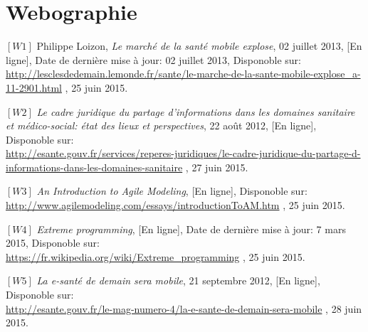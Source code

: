 
\chapter*{Webographie}

\footnotesize

\noindent $[W1]$ \hspace{2pt} Philippe Loizon, \textit{Le marché de la santé mobile explose}, 02 juillet 2013, [En ligne], Date de dernière mise à jour: 02 juillet 2013, Disponoble sur: \\
\scriptsize{\underline{http://lesclesdedemain.lemonde.fr/sante/le-marche-de-la-sante-mobile-explose\_a-11-2901.html}} \footnotesize, 25 juin 2015.

\vspace{8pt}
\paragraphmark

\noindent $[W2]$ \hspace{2pt} \textit{Le cadre juridique du partage d’informations dans les domaines sanitaire et médico-social: état des lieux et perspectives}, 22 août 2012, [En ligne], Disponoble sur: \\
\scriptsize{\underline{http://esante.gouv.fr/services/reperes-juridiques/le-cadre-juridique-du-partage-d-informations-dans-les-domaines-sanitaire}} \footnotesize, 27 juin 2015.

\vspace{8pt}
\paragraphmark

\noindent $[W3]$ \hspace{2pt} \textit{An Introduction to Agile Modeling}, [En ligne], Disponoble sur: \\
\scriptsize{\underline{http://www.agilemodeling.com/essays/introductionToAM.htm}} \footnotesize, 25 juin 2015.

\vspace{8pt}
\paragraphmark

\noindent $[W4]$ \hspace{2pt} \textit{Extreme programming}, [En ligne], Date de dernière mise à jour: 7 mars 2015, Disponoble sur: \\
\scriptsize{\underline{https://fr.wikipedia.org/wiki/Extreme\_programming}} \footnotesize, 25 juin 2015.

\vspace{8pt}
\paragraphmark

\noindent $[W5]$ \hspace{2pt} \textit{La e-santé de demain sera mobile},  21 septembre 2012, [En ligne], Disponoble sur: \\
\scriptsize{\underline{http://esante.gouv.fr/le-mag-numero-4/la-e-sante-de-demain-sera-mobile}} \footnotesize, 28 juin 2015.

